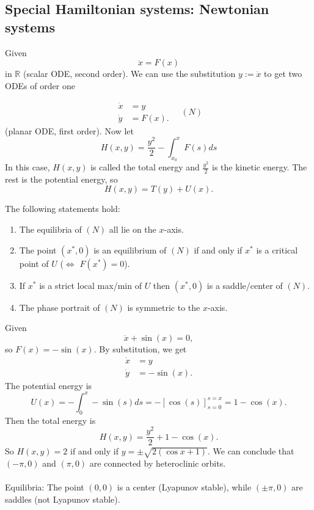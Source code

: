 \documentclass{article}
\newcommand*{\R}{\mathbb{R}}
\newcommand*{\half}[1]{\frac{#1}{2}}
\begin{document}
\subsection{Special Hamiltonian systems: Newtonian systems}

Given
$$\ddot x = F(x)$$
in $\R$ (scalar ODE, second order). We can use the substitution $y:= \dot x$ to get two ODEs of order one


$$\begin{aligned}
    \dot x &= y\\
    \dot y &= F(x).
\end{aligned}\quad (N)$$
(planar ODE, first order). Now let
$$H(x,y) = \half{y^2}-\int_{x_0}^x F(s)ds$$
In this case, $H(x,y)$ is called the total energy and $\half{y^2}$ is the kinetic energy. The rest is the potential energy, so
$$H(x,y) = T(y)+U(x).$$

\begin{thm}
    The following statements hold:
    \begin{enumerate}
        \item The equilibria of $(N)$ all lie on the $x$-axis.

        \item The point $(x^*,0)$ is an equilibrium of $(N)$ if and only if $x^*$ is a critical point of $U$ ($\Leftrightarrow$ $F(x^*) = 0$).

        \item If $x^*$ is a strict local max/min of $U$ then $(x^*,0)$ is a saddle/center of $(N)$.

        \item The phase portrait of $(N)$ is symmetric to the $x$-axis.
    \end{enumerate}
\end{thm}

\begin{exam}
    Given
    $$\ddot x +\sin(x) = 0,$$
    so $F(x) = -\sin(x)$. By substitution, we get
    $$\begin{aligned}
        \dot x &= y\\
        \dot y &= -\sin(x).
    \end{aligned}$$
    The potential energy is
    $$U(x) = -\int_0^x-\sin(s)ds = -[\cos(s)]_{s=0}^{s=x} = 1-\cos(x).$$
    Then the total energy is
    $$H(x,y) = \half {y^2}+1-\cos(x).$$
    So $H(x,y) = 2$ if and only if $y = \pm\sqrt{2(\cos x+1)}$. We can conclude that $(-\pi,0)$ and $(\pi,0)$ are connected by heteroclinic orbits.\\
    \\
    Equilibria: The point $(0,0)$ is a center (Lyapunov stable), while $(\pm \pi,0)$ are saddles (not Lyapunov stable).
\end{exam}
\end{document}
